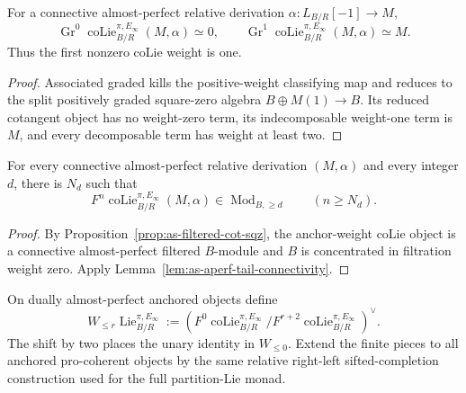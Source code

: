 \begin{lemma}
\label{lem:as-positive-anchor-weight}
For a connective almost-perfect relative derivation
$\alpha:L_{B/R}[-1]\to M$,
\[
    \operatorname{Gr}^0
    \operatorname{coLie}^{\pi,E_\infty}_{B/R}(M,\alpha)
    \simeq0,
    \qquad
    \operatorname{Gr}^1
    \operatorname{coLie}^{\pi,E_\infty}_{B/R}(M,\alpha)
    \simeq M.
\]
Thus the first nonzero coLie weight is one.
\end{lemma}

\begin{proof}
Associated graded kills the positive-weight classifying map and reduces to
the split positively graded square-zero algebra $B\oplus M(1)\to B$.  Its
reduced cotangent object has no weight-zero term, its indecomposable
weight-one term is $M$, and every decomposable term has weight at least two.
\end{proof}

\begin{lemma}
\label{lem:as-anchor-weight-tail-connectivity}
For every connective almost-perfect relative derivation
$(M,\alpha)$ and every integer $d$, there is $N_d$ such that
\[
\boxed{
    F^n
    \operatorname{coLie}^{\pi,E_\infty}_{B/R}(M,\alpha)
    \in
    \operatorname{Mod}_{B,\geq d}
    \qquad
    (n\geq N_d).
}
\]
\end{lemma}

\begin{proof}
By Proposition~\ref{prop:as-filtered-cot-sqz}, the anchor-weight coLie object
is a connective almost-perfect filtered $B$-module and $B$ is concentrated in
filtration weight zero.  Apply
Lemma~\ref{lem:as-aperf-tail-connectivity}.
\end{proof}

\begin{construction}
\label{con:as-finite-anchor-weight-monad}
On dually almost-perfect anchored objects define
\[
\boxed{
    W_{\le r}\operatorname{Lie}^{\pi,E_\infty}_{B/R}
    :=
    \left(
        F^0\operatorname{coLie}^{\pi,E_\infty}_{B/R}/
        F^{r+2}\operatorname{coLie}^{\pi,E_\infty}_{B/R}
    \right)^\vee.
}
\]
The shift by two places the unary identity in $W_{\le0}$.  Extend the finite
pieces to all anchored pro-coherent objects by the same relative right-left
sifted-completion construction used for the full partition-Lie monad.
\end{construction}

